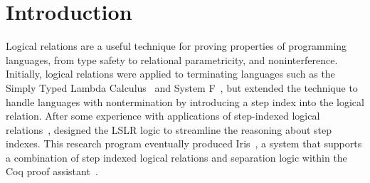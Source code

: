 \documentclass[acmsmall]{acmart}
\begin{document}



\maketitle


\section{Introduction}

Logical relations are a useful technique for proving properties of
programming languages, from type safety to relational parametricity,
and noninterference.  Initially, logical relations were applied to
terminating languages such as the Simply Typed Lambda
Calculus~\citep{Tait:1967aa} and System F~\citep{GIRARD72}, but
\citet{Appel:2001aa} extended the technique to handle languages with
nontermination by introducing a step index into the logical
relation. After some experience with applications of step-indexed
logical
relations~\citep{Ahmed:2004eu,Ahmed:2009aa,Neis:2009fk,Hur:2011aa},
\citet{Dreyer:2011wl} designed the LSLR logic to streamline the
reasoning about step indexes. This research program eventually
produced Iris~\citep{JUNG:2018aa}, a system that supports a
combination of step indexed logical relations and separation logic
within the Coq proof
assistant~\citep{The-Coq-Development-Team:2004kf,Huet:2016aa}.
\end{document}
